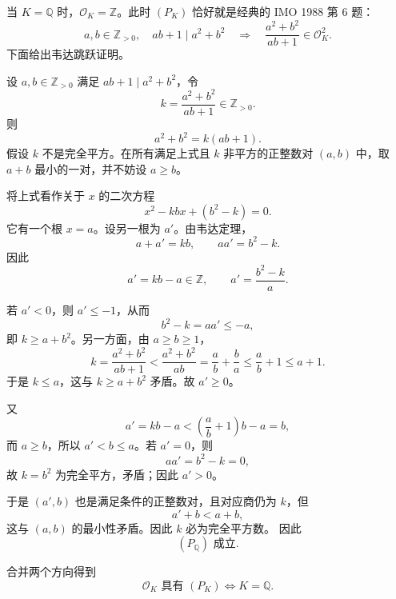 \documentclass[11pt,a4paper]{article}
\newcommand{\OK}{\mathcal O_K}
\newcommand{\Q}{\mathbb Q}
\begin{document}
当 \(K=\Q\) 时，\(\OK=\mathbb Z\)。此时 \((P_K)\) 恰好就是经典的 IMO 1988 第 6 题：
\[
a,b\in\mathbb Z_{>0},\quad ab+1\mid a^2+b^2
\quad\Longrightarrow\quad
\frac{a^2+b^2}{ab+1}\in\OK^2.
\]
下面给出韦达跳跃证明。

设 \(a,b\in\mathbb Z_{>0}\) 满足 \(ab+1\mid a^2+b^2\)，令
\[
k=\frac{a^2+b^2}{ab+1}\in\mathbb Z_{>0}.
\]
则
\[
a^2+b^2=k(ab+1).
\]
假设 \(k\) 不是完全平方。在所有满足上式且 \(k\) 非平方的正整数对 \((a,b)\) 中，取 \(a+b\) 最小的一对，并不妨设 \(a\ge b\)。

将上式看作关于 \(x\) 的二次方程
\[
x^2-kbx+(b^2-k)=0.
\]
它有一个根 \(x=a\)。设另一根为 \(a'\)。由韦达定理，
\[
a+a'=kb,\qquad aa'=b^2-k.
\]
因此
\[
a'=kb-a\in\mathbb Z,\qquad a'=\frac{b^2-k}{a}.
\]

若 \(a'<0\)，则 \(a'\le -1\)，从而
\[
b^2-k=aa'\le -a,
\]
即 \(k\ge a+b^2\)。另一方面，由 \(a\ge b\ge1\)，
\[
k=\frac{a^2+b^2}{ab+1}
<\frac{a^2+b^2}{ab}
=\frac ab+\frac ba
\le \frac ab+1
\le a+1.
\]
于是 \(k\le a\)，这与 \(k\ge a+b^2\) 矛盾。故 \(a'\ge0\)。

又
\[
a'=kb-a<\left(\frac ab+1\right)b-a=b,
\]
而 \(a\ge b\)，所以 \(a'<b\le a\)。若 \(a'=0\)，则
\[
aa'=b^2-k=0,
\]
故 \(k=b^2\) 为完全平方，矛盾；因此 \(a'>0\)。

于是 \((a',b)\) 也是满足条件的正整数对，且对应商仍为 \(k\)，但
\[
a'+b<a+b,
\]
这与 \((a,b)\) 的最小性矛盾。因此 \(k\) 必为完全平方数。
因此
\[
(P_{\Q})\text{ 成立}.
\]

合并两个方向得到
\[
\OK\text{ 具有 }(P_K)
\iff
K=\Q.
\]
\end{document}
